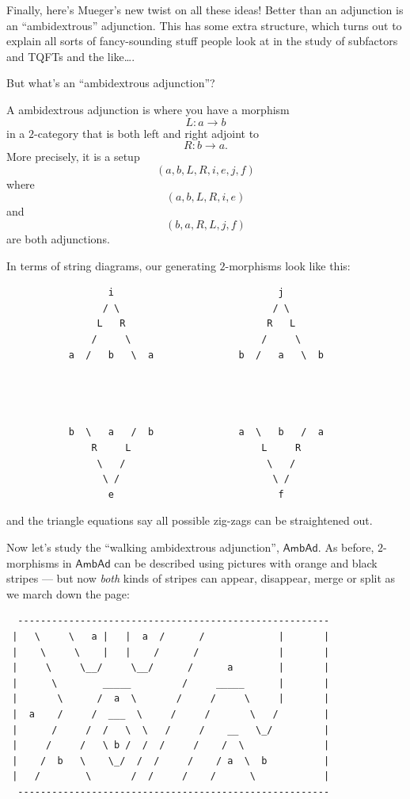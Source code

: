 \documentclass{article}
\begin{document}
Finally, here's Mueger's new twist on all these ideas! Better than an
adjunction is an ``ambidextrous'' adjunction. This has some extra
structure, which turns out to explain all sorts of fancy-sounding stuff
people look at in the study of subfactors and TQFTs and the like\ldots.

But what's an ``ambidextrous adjunction''?

A ambidextrous adjunction is where you have a morphism
\[L\colon a \to b\] in a \(2\)-category that is both left and right
adjoint to \[R\colon b \to a.\] More precisely, it is a setup
\[(a,b,L,R,i,e,j,f)\] where \[(a,b,L,R,i,e)\] and \[(b,a,R,L,j,f)\] are
both adjunctions.

In terms of string diagrams, our generating \(2\)-morphisms look like
this:

\begin{verbatim}
                  i                             j
                 / \                           / \
                L   R                         R   L
               /     \                       /     \
           a  /   b   \  a               b  /   a   \  b




           b  \   a   /  b               a  \   b   /  a
               R     L                       L     R
                \   /                         \   /
                 \ /                           \ /
                  e                             f
\end{verbatim}

and the triangle equations say all possible zig-zags can be straightened
out.

Now let's study the ``walking ambidextrous adjunction'',
\(\mathsf{AmbAd}\). As before, \(2\)-morphisms in \(\mathsf{AmbAd}\) can
be described using pictures with orange and black stripes --- but now
\emph{both} kinds of stripes can appear, disappear, merge or split as we
march down the page:

\begin{verbatim}
  -------------------------------------------------------
 |   \     \   a |   |  a  /      /             |       |
 |    \     \    |   |    /      /              |       |
 |     \     \__/     \__/      /      a        |       |
 |      \        _____         /     _____      |       |
 |       \      /  a  \       /     /     \     |       |
 |  a    /     /  ___  \     /     /       \   /        |
 |      /     /  /   \  \   /     /    __   \_/         |
 |     /     /   \ b /  /  /     /    /  \              |
 |    /  b   \    \_/  /  /     /    / a  \  b          |
 |   /        \       /  /     /    /      \            |
  -------------------------------------------------------
\end{verbatim}
\end{document}
